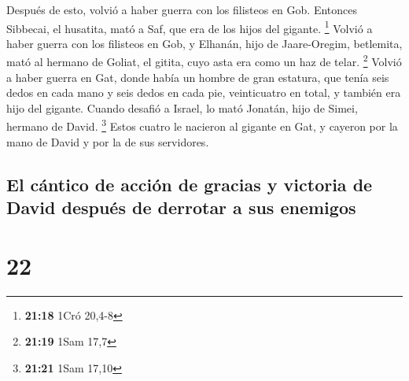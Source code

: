  Después de esto, volvió a haber guerra con los filisteos
en Gob. Entonces Sibbecai, el husatita, mató a Saf, que era de los hijos
del gigante. \footnote{\textbf{21:18} 1Cró 20,4-8} 
Volvió a haber guerra con los filisteos en Gob, y Elhanán, hijo de
Jaare-Oregim, betlemita, mató al hermano de Goliat, el gitita, cuyo asta
era como un haz de telar. \footnote{\textbf{21:19} 1Sam 17,7}
 Volvió a haber guerra en Gat, donde había un hombre de
gran estatura, que tenía seis dedos en cada mano y seis dedos en cada
pie, veinticuatro en total, y también era hijo del gigante.
 Cuando desafió a Israel, lo mató Jonatán, hijo de Simei,
hermano de David. \footnote{\textbf{21:21} 1Sam 17,10} 
Estos cuatro le nacieron al gigante en Gat, y cayeron por la mano de
David y por la de sus servidores.

\hypertarget{el-cuxe1ntico-de-acciuxf3n-de-gracias-y-victoria-de-david-despuuxe9s-de-derrotar-a-sus-enemigos}{%
\subsection{El cántico de acción de gracias y victoria de David después
de derrotar a sus
enemigos}\label{el-cuxe1ntico-de-acciuxf3n-de-gracias-y-victoria-de-david-despuuxe9s-de-derrotar-a-sus-enemigos}}

\hypertarget{section-21}{%
\section{22}\label{section-21}}

